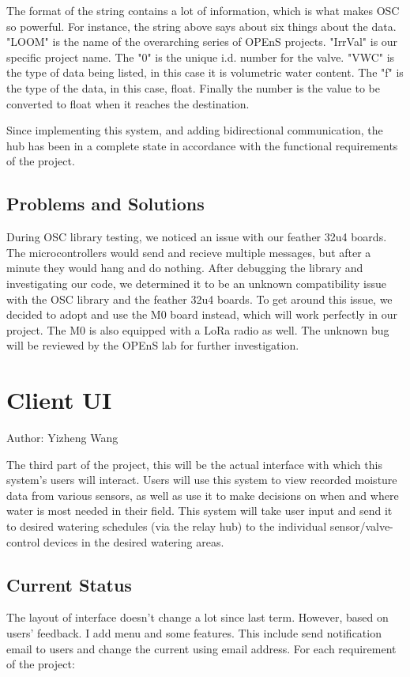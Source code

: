 \documentclass[onecolumn, draftclsnofoot,10pt, compsoc]{IEEEtran}
\begin{document}
    The format of the string contains a lot of information, which is what makes OSC so powerful. For instance, the string above says about six things about the data. "LOOM" is the name of the overarching series of OPEnS projects. 
    "IrrVal" is our specific project name.
    The "0" is the unique i.d. number for the valve. 
    "VWC" is the type of data being listed, in this case it is volumetric water content. 
    The "f" is the type of the data, in this case, float. 
    Finally the number is the value to be converted to float when it reaches the destination. 
    
    Since implementing this system, and adding bidirectional communication, the hub has been in a complete state in accordance with the functional requirements of the project. 
    
    \subsection{Problems and Solutions}
	During OSC library testing, we noticed an issue with our feather 32u4 boards.
    The microcontrollers would send and recieve multiple messages, but after a minute they would hang and do nothing. 
    After debugging the library and investigating our code, we determined it to be an unknown compatibility issue with the OSC library and the feather 32u4 boards. 
    To get around this issue, we decided to adopt and use the M0 board instead, which will work perfectly in our project. 
    The M0 is also equipped with a LoRa radio as well. 
    The unknown bug will be reviewed by the OPEnS lab for further investigation.
    
    \section{Client UI}
    Author: Yizheng Wang
    
    The third part of the project, this will be the actual interface with which this system’s users will interact. Users will use this system to view recorded moisture data from various sensors, as well as use it to make decisions on when and where water is most needed in their field. This system will take user input and send it to desired watering schedules (via the relay hub) to the individual sensor/valve-control devices in the desired watering areas.
   	\subsection{Current Status}%
     The layout of interface doesn't change a lot since last term. However, based on users' feedback. I add menu and some features. This include send notification email to users and change the current using email address. For each requirement of the project:
\end{document}
